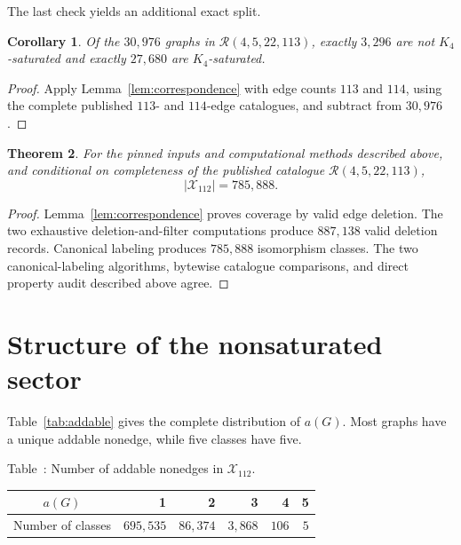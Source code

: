 \documentclass[10pt]{article}
\newtheorem{theorem}{Theorem}
\newtheorem{corollary}[theorem]{Corollary}
\theoremstyle{definition}
\theoremstyle{remark}
\newcommand{\Rcal}{\mathcal{R}}
\newcommand{\Xcal}{\mathcal{X}}
\begin{document}
The last check yields an additional exact split.

\begin{corollary}\label{cor:e113split}
Of the $30{,}976$ graphs in $\Rcal(4,5,22,113)$, exactly $3{,}296$ are not
$K_4$-saturated and exactly $27{,}680$ are $K_4$-saturated.
\end{corollary}

\begin{proof}
Apply Lemma~\ref{lem:correspondence} with edge counts $113$ and $114$, using
the complete published $113$- and $114$-edge catalogues, and subtract from
$30{,}976$.
\end{proof}

\begin{theorem}\label{thm:main}
For the pinned inputs and computational methods described above, and
conditional on completeness of the published catalogue
$\Rcal(4,5,22,113)$,
\[
 |\Xcal_{112}|=785{,}888.
\]
\end{theorem}

\begin{proof}
Lemma~\ref{lem:correspondence} proves coverage by valid edge deletion.
The two exhaustive deletion-and-filter computations produce $887{,}138$
valid deletion records.  Canonical labeling produces $785{,}888$
isomorphism classes.  The two canonical-labeling algorithms, bytewise
catalogue comparisons, and direct property audit described above agree.
\end{proof}

\section{Structure of the nonsaturated sector}

Table~\ref{tab:addable} gives the complete distribution of $a(G)$.  Most
graphs have a unique addable nonedge, while five classes have five.

\begin{center}
Table~\thetable: Number of addable nonedges in $\Xcal_{112}$.\label{tab:addable}\par\smallskip
\begin{tabular}{crrrrr}
\toprule
$a(G)$ & 1 & 2 & 3 & 4 & 5 \\
\midrule
Number of classes & $695{,}535$ & $86{,}374$ & $3{,}868$ & $106$ & $5$ \\
\bottomrule
\end{tabular}
\end{center}
\end{document}
